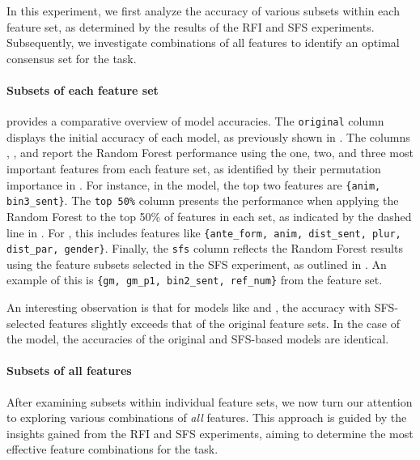 In this experiment, we first analyze the accuracy of various subsets within each feature set, as determined by the results of the RFI and SFS experiments. Subsequently, we investigate combinations of all features to identify an optimal consensus set for the \context task.

\paragraph*{Subsets of each feature set}\label{par:subset1}

 provides a comparative overview of model accuracies. The \texttt{original} column displays the initial accuracy of each model, as previously shown in . The columns , , and  report the Random Forest performance using the one, two, and three most important features from each feature set, as identified by their permutation importance in . For instance, in the  model, the top two features are \texttt{\{anim, bin3\_sent\}}. The \texttt{top 50\%} column presents the performance when applying the Random Forest to the top 50\% of features in each set, as indicated by the dashed line in . For , this includes features like \texttt{\{ante\_form, anim, dist\_sent, plur, dist\_par, gender\}}. Finally, the \texttt{sfs} column reflects the Random Forest results using the feature subsets selected in the SFS experiment, as outlined in . An example of this is \texttt{\{gm, gm\_p1, bin2\_sent, ref\_num\}} from the  feature set.

 

An interesting observation is that for models like  and , the accuracy with SFS-selected features slightly exceeds that of the original feature sets. In the case of the  model, the accuracies of the original and SFS-based models are identical.
 
 \paragraph*{Subsets of all features}\label{par:sebset2}

After examining subsets within individual feature sets, we now turn our attention to exploring various combinations of \textit{all} features. This approach is guided by the insights gained from the RFI and SFS experiments, aiming to determine the most effective feature combinations for the \context task.



